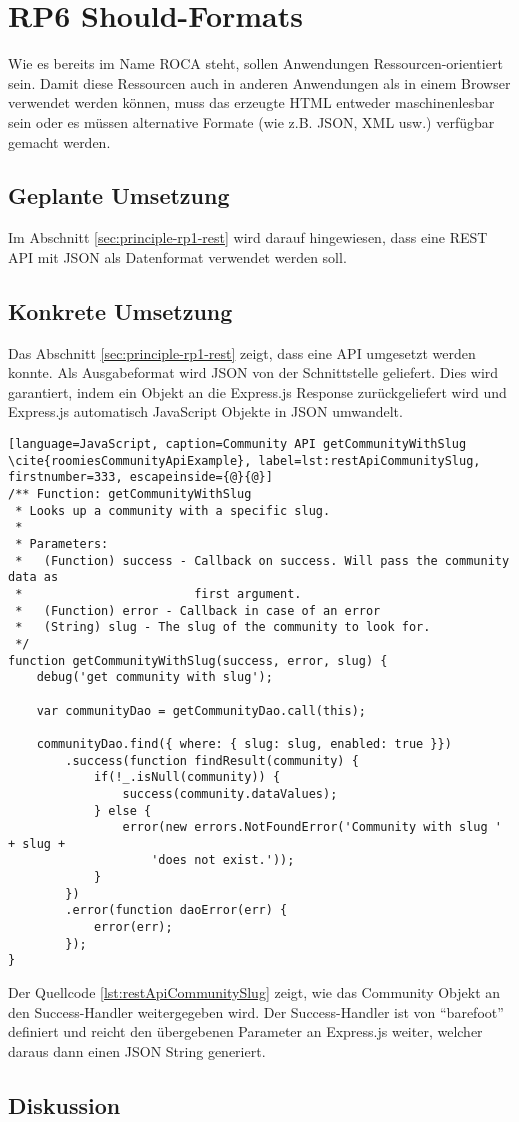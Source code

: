 \section{RP6 Should-Formats}
\label{sec:principle-rp6-should-formats}
Wie es bereits im Name ROCA steht, sollen Anwendungen Ressourcen-orientiert sein. Damit diese Ressourcen auch in anderen Anwendungen als in einem Browser verwendet werden können, muss das erzeugte HTML entweder maschinenlesbar sein oder es müssen alternative Formate (wie z.B. JSON, XML usw.) verfügbar gemacht werden.

\subsection*{Geplante Umsetzung}
Im Abschnitt \ref{sec:principle-rp1-rest}  wird darauf hingewiesen, dass eine REST API mit JSON als Datenformat verwendet werden soll.

\subsection*{Konkrete Umsetzung}
Das Abschnitt \ref{sec:principle-rp1-rest}  zeigt, dass eine API umgesetzt werden konnte.
Als Ausgabeformat wird JSON von der Schnittstelle geliefert. Dies wird garantiert, indem ein Objekt an die Express.js Response \cite{ExpressjsResSend} zurückgeliefert wird und Express.js automatisch JavaScript Objekte in JSON umwandelt.

\begin{lstlisting}[language=JavaScript, caption=Community API getCommunityWithSlug \cite{roomiesCommunityApiExample}, label=lst:restApiCommunitySlug, firstnumber=333, escapeinside={@}{@}]
/** Function: getCommunityWithSlug
 * Looks up a community with a specific slug.
 *
 * Parameters:
 *   (Function) success - Callback on success. Will pass the community data as
 *                        first argument.
 *   (Function) error - Callback in case of an error
 *   (String) slug - The slug of the community to look for.
 */
function getCommunityWithSlug(success, error, slug) {
	debug('get community with slug');

	var communityDao = getCommunityDao.call(this);

	communityDao.find({ where: { slug: slug, enabled: true }})
		.success(function findResult(community) {
			if(!_.isNull(community)) {
				success(community.dataValues);
			} else {
				error(new errors.NotFoundError('Community with slug ' + slug +
					'does not exist.'));
			}
		})
		.error(function daoError(err) {
			error(err);
		});
}
\end{lstlisting}

Der Quellcode \ref{lst:restApiCommunitySlug} zeigt, wie das Community Objekt an den Success-Handler weitergegeben wird. Der Success-Handler ist von ``barefoot'' definiert und reicht den übergebenen Parameter an Express.js weiter, welcher daraus dann einen JSON String generiert.

\subsection*{Diskussion}
